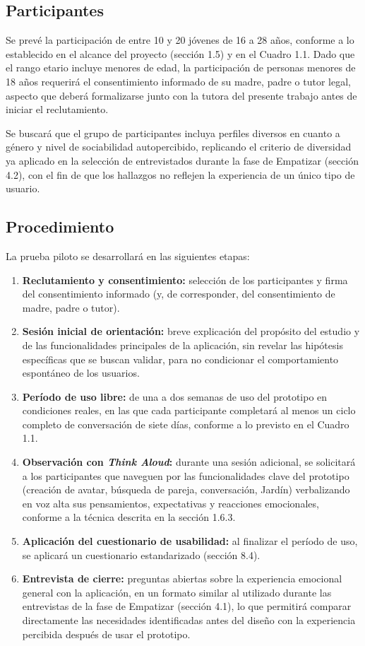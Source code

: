 \subsection{Participantes}
Se prevé la participación de entre 10 y 20 jóvenes de 16 a 28 años, conforme a lo establecido en el alcance del proyecto (sección 1.5) y en el Cuadro 1.1. Dado que el rango etario incluye menores de edad, la participación de personas menores de 18 años requerirá el consentimiento informado de su madre, padre o tutor legal, aspecto que deberá formalizarse junto con la tutora del presente trabajo antes de iniciar el reclutamiento.

Se buscará que el grupo de participantes incluya perfiles diversos en cuanto a género y nivel de sociabilidad autopercibido, replicando el criterio de diversidad ya aplicado en la selección de entrevistados durante la fase de Empatizar (sección 4.2), con el fin de que los hallazgos no reflejen la experiencia de un único tipo de usuario.

\subsection{Procedimiento}
La prueba piloto se desarrollará en las siguientes etapas:

\begin{enumerate}
    \item \textbf{Reclutamiento y consentimiento:} selección de los participantes y firma del consentimiento informado (y, de corresponder, del consentimiento de madre, padre o tutor).
    \item \textbf{Sesión inicial de orientación:} breve explicación del propósito del estudio y de las funcionalidades principales de la aplicación, sin revelar las hipótesis específicas que se buscan validar, para no condicionar el comportamiento espontáneo de los usuarios.
    \item \textbf{Período de uso libre:} de una a dos semanas de uso del prototipo en condiciones reales, en las que cada participante completará al menos un ciclo completo de conversación de siete días, conforme a lo previsto en el Cuadro 1.1.
    \item \textbf{Observación con \textit{Think Aloud}:} durante una sesión adicional, se solicitará a los participantes que naveguen por las funcionalidades clave del prototipo (creación de avatar, búsqueda de pareja, conversación, Jardín) verbalizando en voz alta sus pensamientos, expectativas y reacciones emocionales, conforme a la técnica descrita en la sección 1.6.3.
    \item \textbf{Aplicación del cuestionario de usabilidad:} al finalizar el período de uso, se aplicará un cuestionario estandarizado (sección 8.4).
    \item \textbf{Entrevista de cierre:} preguntas abiertas sobre la experiencia emocional general con la aplicación, en un formato similar al utilizado durante las entrevistas de la fase de Empatizar (sección 4.1), lo que permitirá comparar directamente las necesidades identificadas antes del diseño con la experiencia percibida después de usar el prototipo.
\end{enumerate}

